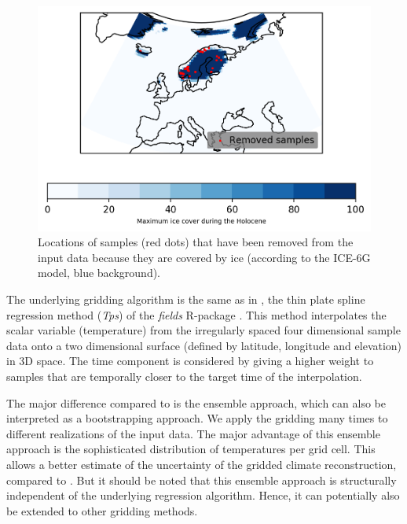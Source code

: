\begin{refsection}
\begin{figure}
\includegraphics[width=\linewidth]{gridding-figures/elevation-mask.png}
\caption[Ice sheet mask of the pollen samples]{Locations of samples (red dots) that have been removed from the input data because they are covered by ice (according to the ICE-6G model, blue background). }
\label{fig:gridding-elev-mask}
\end{figure}

The underlying gridding algorithm is the same as in \cite{MauriDavisCollinsEtAl2015}, the thin plate spline regression method (\textit{Tps}) of the \textit{fields} R-package \citep{NychkaFurrerPaigeEtAl2017, RCT2019}. This method interpolates the scalar variable (temperature) from the irregularly spaced four dimensional sample data onto a two dimensional surface (defined by latitude, longitude and elevation) in 3D space. The time component is considered by giving a higher weight to samples that are temporally closer to the target time of the interpolation.

The major difference compared to \cite{MauriDavisCollinsEtAl2015} is the ensemble approach, which can also be interpreted as a bootstrapping approach. We apply the gridding many times to different realizations of the input data. The major advantage of this ensemble approach is the sophisticated distribution of temperatures per grid cell. This allows a better estimate of the uncertainty of the gridded climate reconstruction, compared to \cite{MauriDavisCollinsEtAl2015}. But it should be noted that this ensemble approach is structurally independent of the underlying regression algorithm. Hence, it can potentially also be extended to other gridding methods.


\end{refsection}

